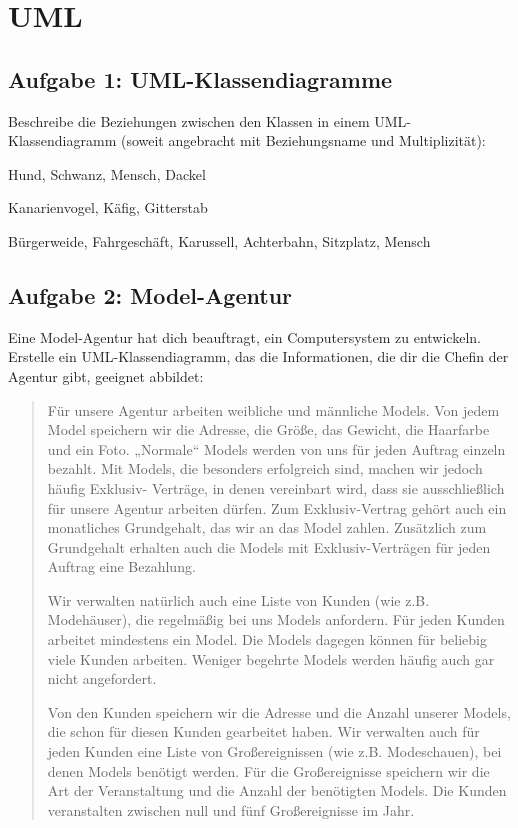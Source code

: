 \section{UML}

\subsection{Aufgabe 1: UML-Klassendiagramme}

Beschreibe die Beziehungen zwischen den Klassen in einem UML-Klassendiagramm
(soweit angebracht mit Beziehungsname und Multiplizität):

\begin{compactenum}
\item Hund, Schwanz, Mensch, Dackel
\item Kanarienvogel, Käfig, Gitterstab
\item Bürgerweide, Fahrgeschäft, Karussell, Achterbahn, Sitzplatz,
Mensch
\end{compactenum}


\subsection{Aufgabe 2: Model-Agentur}

Eine Model-Agentur hat dich beauftragt, ein Computersystem zu entwickeln.
Erstelle ein UML-Klassendiagramm, das die Informationen, die dir die Chefin der
Agentur gibt, geeignet abbildet:

\begin{quotation}
\noindent Für unsere Agentur arbeiten weibliche und männliche Models. Von jedem
Model speichern wir die Adresse, die Größe, das Gewicht, die Haarfarbe und ein
Foto. „Normale“ Models werden von uns für jeden Auftrag einzeln bezahlt. Mit
Models, die besonders erfolgreich sind, machen wir jedoch häufig Exklusiv-
Verträge, in denen vereinbart wird, dass sie ausschließlich für unsere Agentur
arbeiten dürfen. Zum Exklusiv-Vertrag gehört auch ein monatliches Grundgehalt,
das wir an das Model zahlen. Zusätzlich zum Grundgehalt erhalten auch die
Models mit Exklusiv-Verträgen für jeden Auftrag eine Bezahlung.

Wir verwalten natürlich auch eine Liste von Kunden (wie z.B. Modehäuser), die
regelmäßig bei uns Models anfordern. Für jeden Kunden arbeitet mindestens ein
Model. Die Models dagegen können für beliebig viele Kunden arbeiten. Weniger
begehrte Models werden häufig auch gar nicht angefordert.

Von den Kunden speichern wir die Adresse und die Anzahl unserer Models, die
schon für diesen Kunden gearbeitet haben. Wir verwalten auch für jeden Kunden
eine Liste von Großereignissen (wie z.B. Modeschauen), bei denen Models benötigt
werden. Für die Großereignisse speichern wir die Art der Veranstaltung und die
Anzahl der benötigten Models. Die Kunden veranstalten zwischen null und fünf
Großereignisse im Jahr.
\end{quotation}

